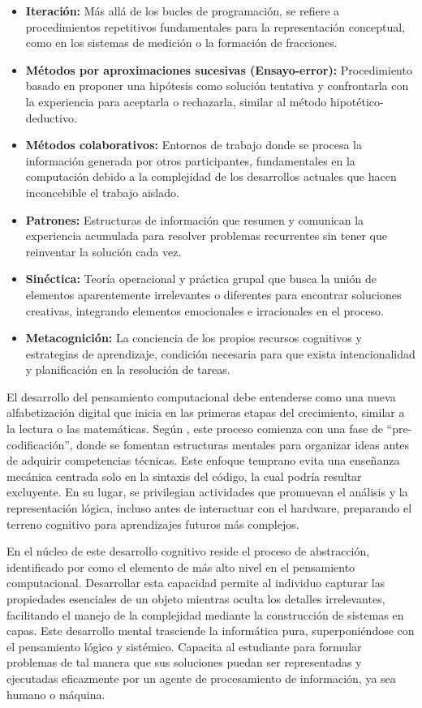 \begin{itemize}
    \item \textbf{Iteración:} Más allá de los bucles de programación, se refiere a procedimientos repetitivos fundamentales para la representación conceptual, como en los sistemas de medición o la formación de fracciones.
    \item \textbf{Métodos por aproximaciones sucesivas (Ensayo-error):} Procedimiento basado en proponer una hipótesis como solución tentativa y confrontarla con la experiencia para aceptarla o rechazarla, similar al método hipotético-deductivo.
    \item \textbf{Métodos colaborativos:} Entornos de trabajo donde se procesa la información generada por otros participantes, fundamentales en la computación debido a la complejidad de los desarrollos actuales que hacen inconcebible el trabajo aislado.
    \item \textbf{Patrones:} Estructuras de información que resumen y comunican la experiencia acumulada para resolver problemas recurrentes sin tener que reinventar la solución cada vez.
    \item \textbf{Sinéctica:} Teoría operacional y práctica grupal que busca la unión de elementos aparentemente irrelevantes o diferentes para encontrar soluciones creativas, integrando elementos emocionales e irracionales en el proceso.
    \item \textbf{Metacognición:} La conciencia de los propios recursos cognitivos y estrategias de aprendizaje, condición necesaria para que exista intencionalidad y planificación en la resolución de tareas.
\end{itemize}


El desarrollo del pensamiento computacional debe entenderse como una nueva alfabetización digital que inicia en las primeras etapas del crecimiento, similar a la lectura o las matemáticas. Según , este proceso comienza con una fase de “pre-codificación”, donde se fomentan estructuras mentales para organizar ideas antes de adquirir competencias técnicas. Este enfoque temprano evita una enseñanza mecánica centrada solo en la sintaxis del código, la cual podría resultar excluyente. En su lugar, se privilegian actividades que promuevan el análisis y la representación lógica, incluso antes de interactuar con el hardware, preparando el terreno cognitivo para aprendizajes futuros más complejos.

En el núcleo de este desarrollo cognitivo reside el proceso de abstracción, identificado por  como el elemento de más alto nivel en el pensamiento computacional. Desarrollar esta capacidad permite al individuo capturar las propiedades esenciales de un objeto mientras oculta los detalles irrelevantes, facilitando el manejo de la complejidad mediante la construcción de sistemas en capas. Este desarrollo mental trasciende la informática pura, superponiéndose con el pensamiento lógico y sistémico. Capacita al estudiante para formular problemas de tal manera que sus soluciones puedan ser representadas y ejecutadas eficazmente por un agente de procesamiento de información, ya sea humano o máquina.

